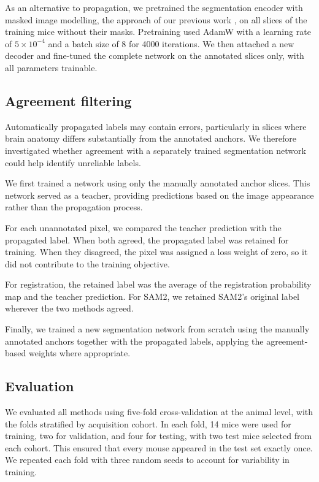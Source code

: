 \documentclass{article}
\begin{document}
As an alternative to propagation, we pretrained the segmentation encoder with masked image modelling, the approach of our previous work \cite{ali2025ssl}, on all slices of the training mice without their masks. Pretraining used AdamW with a learning rate of $5\times10^{-4}$ and a batch size of 8 for 4000 iterations. We then attached a new decoder and fine-tuned the complete network on the annotated slices only, with all parameters trainable.

\subsection{Agreement filtering}
\label{sec:agree}

Automatically propagated labels may contain errors, particularly in slices where brain anatomy differs substantially from the annotated anchors. We therefore investigated whether agreement with a separately trained segmentation network could help identify unreliable labels.

We first trained a network using only the manually annotated anchor slices. This network served as a teacher, providing predictions based on the image appearance rather than the propagation process.

For each unannotated pixel, we compared the teacher prediction with the propagated label. When both agreed, the propagated label was retained for training. When they disagreed, the pixel was assigned a loss weight of zero, so it did not contribute to the training objective.

For registration, the retained label was the average of the registration probability map and the teacher prediction. For SAM2, we retained SAM2's original label wherever the two methods agreed.

Finally, we trained a new segmentation network from scratch using the manually annotated anchors together with the propagated labels, applying the agreement-based weights where appropriate.


\subsection{Evaluation}

We evaluated all methods using five-fold cross-validation at the animal level, with the folds stratified by acquisition cohort. In each fold, 14 mice were used for training, two for validation, and four for testing, with two test mice selected from each cohort. This ensured that every mouse appeared in the test set exactly once. We repeated each fold with three random seeds to account for variability in training.
\end{document}
